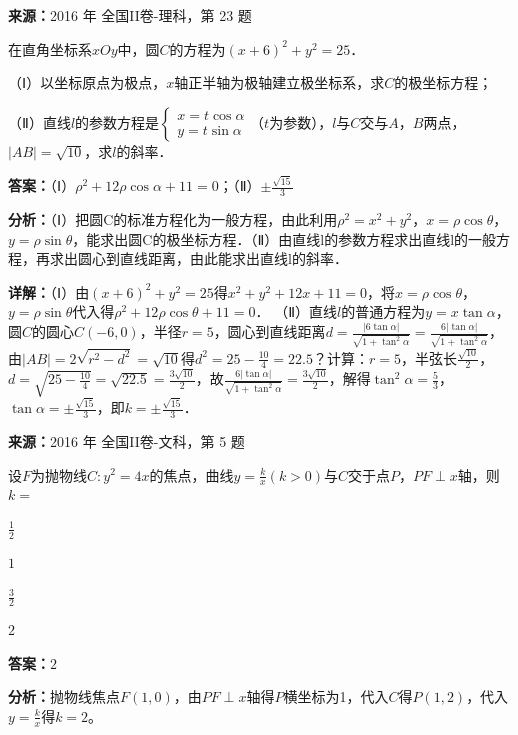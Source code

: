 \begin{question}[points=10]
\textbf{来源：}2016 年 全国II卷-理科，第 23 题\par
在直角坐标系$xOy$中，圆$C$的方程为$(x+6)^2+y^2=25$．

（Ⅰ）以坐标原点为极点，$x$轴正半轴为极轴建立极坐标系，求$C$的极坐标方程；

（Ⅱ）直线$l$的参数方程是$\begin{cases} x=t\cos\alpha \\ y=t\sin\alpha \end{cases}$（$t$为参数），$l$与$C$交与$A$，$B$两点，$|AB|=\sqrt{10}$，求$l$的斜率．
\begin{solution}
\textbf{答案：}（Ⅰ）$\rho^2+12\rho\cos\alpha+11=0$；（Ⅱ）$\pm\frac{\sqrt{15}}{3}$

\textbf{分析：}（Ⅰ）把圆C的标准方程化为一般方程，由此利用$\rho^2=x^2+y^2$，$x=\rho\cos\theta$，$y=\rho\sin\theta$，能求出圆C的极坐标方程．（Ⅱ）由直线l的参数方程求出直线l的一般方程，再求出圆心到直线距离，由此能求出直线l的斜率．

\textbf{详解：}（Ⅰ）由$(x+6)^2+y^2=25$得$x^2+y^2+12x+11=0$，将$x=\rho\cos\theta$，$y=\rho\sin\theta$代入得$\rho^2+12\rho\cos\theta+11=0$．
（Ⅱ）直线$l$的普通方程为$y=x\tan\alpha$，圆$C$的圆心$C(-6,0)$，半径$r=5$，圆心到直线距离$d=\frac{|6\tan\alpha|}{\sqrt{1+\tan^2\alpha}}=\frac{6|\tan\alpha|}{\sqrt{1+\tan^2\alpha}}$，由$|AB|=2\sqrt{r^2-d^2}=\sqrt{10}$得$d^2=25-\frac{10}{4}=22.5$？计算：$r=5$，半弦长$\frac{\sqrt{10}}{2}$，$d=\sqrt{25-\frac{10}{4}}=\sqrt{22.5}=\frac{3\sqrt{10}}{2}$，故$\frac{6|\tan\alpha|}{\sqrt{1+\tan^2\alpha}}=\frac{3\sqrt{10}}{2}$，解得$\tan^2\alpha=\frac{5}{3}$，$\tan\alpha=\pm\frac{\sqrt{15}}{3}$，即$k=\pm\frac{\sqrt{15}}{3}$．
\end{solution}
\end{question}

\begin{question}[points=5]
\textbf{来源：}2016 年 全国II卷-文科，第 5 题\par
设$F$为抛物线$C:y^2=4x$的焦点，曲线$y=\frac{k}{x}(k>0)$与$C$交于点$P$，$PF\perp x$轴，则$k=$
\begin{choices}
  \item $\frac{1}{2}$
  \item $1$
  \item $\frac{3}{2}$
  \item $2$
\end{choices}
\begin{solution}
\textbf{答案：}$2$

\textbf{分析：}抛物线焦点$F(1,0)$，由$PF\perp x$轴得$P$横坐标为1，代入$C$得$P(1,2)$，代入$y=\frac{k}{x}$得$k=2$。
\end{solution}
\end{question}

